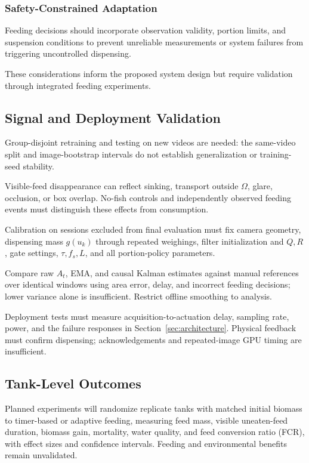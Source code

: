 \documentclass[10pt,conference,letterpaper]{IEEEtran}
\begin{document}
\subsubsection{Safety-Constrained Adaptation}
Feeding decisions should incorporate observation validity, portion limits, and suspension conditions to prevent unreliable measurements or system failures from triggering uncontrolled dispensing.

These considerations inform the proposed system design but require validation through integrated feeding experiments.

\subsection{Signal and Deployment Validation}
Group-disjoint retraining and testing on new videos are needed: the same-video split and image-bootstrap intervals do not establish generalization or training-seed stability.

Visible-feed disappearance can reflect sinking, transport outside $\Omega$, glare, occlusion, or box overlap. No-fish controls and independently observed feeding events must distinguish these effects from consumption.

Calibration on sessions excluded from final evaluation must fix camera geometry, dispensing mass $g(u_k)$ through repeated weighings, filter initialization and $Q,R$, gate settings, $\tau,f_s,L$, and all portion-policy parameters.

Compare raw $A_t$, EMA, and causal Kalman estimates against manual references over identical windows using area error, delay, and incorrect feeding decisions; lower variance alone is insufficient. Restrict offline smoothing to analysis.

Deployment tests must measure acquisition-to-actuation delay, sampling rate, power, and the failure responses in Section~\ref{sec:architecture}. Physical feedback must confirm dispensing; acknowledgements and repeated-image GPU timing are insufficient.

\subsection{Tank-Level Outcomes}
Planned experiments will randomize replicate tanks with matched initial biomass to timer-based or adaptive feeding, measuring feed mass, visible uneaten-feed duration, biomass gain, mortality, water quality, and feed conversion ratio (FCR), with effect sizes and confidence intervals. Feeding and environmental benefits remain unvalidated.
\end{document}
